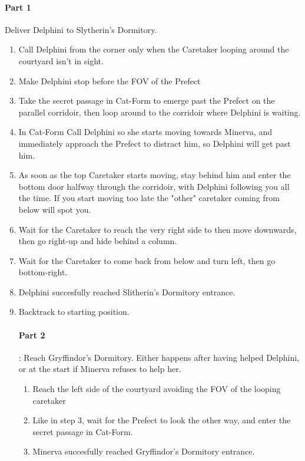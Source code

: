 \paragraph{Part 1} Deliver Delphini to Slytherin's Dormitory.
\begin{enumerate}[label={\arabic*.}]
	\item Call Delphini from the corner only when the Caretaker looping around the courtyard isn't in sight.
	\item Make Delphini stop before the FOV of the Prefect
	\item Take the secret passage in Cat-Form to emerge past the Prefect on the parallel corridoir, then loop around to the corridoir where Delphini is waiting.
	\item In Cat-Form Call Delphini so she starts moving towards Minerva, and immediately approach the Prefect to distract him, so Delphini will get past him.
	\item As soon as the top Caretaker starts moving, stay behind him and enter the bottom door halfway through the corridoir, with Delphini following you all the time. If you start moving too late the "other" caretaker coming from below will spot you.
	\item Wait for the Caretaker to reach the very right side to then move downwards, then go right-up and hide behind a column.
	\item Wait for the Caretaker to come back from below and turn left, then go bottom-right.
	\item Delphini succesfully reached Slitherin's Dormitory entrance.
	\item Backtrack to starting position.
\begin{end}

\paragraph{Part 2}: Reach Gryffindor's Dormitory. Either happens after having helped Delphini, or at the start if Minerva refuses to help her.
\begin{enumerate}[label={\arabic*.}, resume]
	\item Reach the left side of the courtyard avoiding the FOV of the looping caretaker
	\item Like in step 3, wait for the Prefect to look the other way, and enter the secret passage in Cat-Form.
	\item Minerva succesfully reached Gryffindor's Dormitory entrance.
\begin{end}


\end{end}
\end{enumerate}
\end{end}
\end{enumerate}

